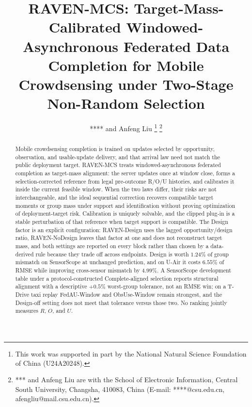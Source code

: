 \documentclass[letterpaper,journal]{IEEEtran}
\begin{document}
\title{RAVEN-MCS: Target-Mass-Calibrated Windowed-Asynchronous Federated Data Completion for Mobile Crowdsensing under Two-Stage Non-Random Selection}

\author{**** and Anfeng Liu%
\thanks{This work was supported in part by the National Natural Science Foundation of China (U24A20248).}%
\thanks{*** and Anfeng Liu are with the School of Electronic Information, Central South University, Changsha, 410083, China (E-mail: ****@csu.edu.cn, afengliu@mail.csu.edu.cn).}%
}


\maketitle


\begin{abstract}
Mobile crowdsensing completion is trained on updates selected by opportunity,
observation, and usable-update delivery, and that arrival law need not match the
public deployment target.  RAVEN-MCS treats windowed-asynchronous federated
completion as target-mass alignment: the server updates once at window close,
forms a selection-corrected reference from legal pre-outcome R/O/U histories, and
calibrates it inside the current feasible window.  When the two laws differ, their
risks are not interchangeable, and the ideal sequential correction recovers
compatible target moments or group mass under support and identification without
proving optimization of deployment-target risk.  Calibration is uniquely
solvable, and the clipped plug-in is a stable perturbation of that reference when
target support is compatible.  The Design factor is an explicit configuration:
RAVEN-Design uses the lagged opportunity/design ratio, RAVEN-NoDesign leaves that
factor at one and does not reconstruct target mass, and both settings are
reported on every block rather than chosen by a data-derived rule because they
trade off across endpoints.  Design is worth $1.24\%$ of group mismatch on
SensorScope at unchanged prediction, and on U-Air it costs $6.55\%$ of RMSE while
improving cross-sensor mismatch by $4.99\%$.  A SensorScope development table
under a protocol-constructed Complete-aligned selection reports structural
alignment with a descriptive $+0.5\%$ worst-group tolerance, not an RMSE win; on
a T-Drive taxi replay FedAU-Window and ObsUse-Window remain strongest, and the
Design-off setting does not meet that tolerance versus those two.  No ranking
jointly measures $R$, $O$, and $U$.
\end{abstract}
\end{document}
